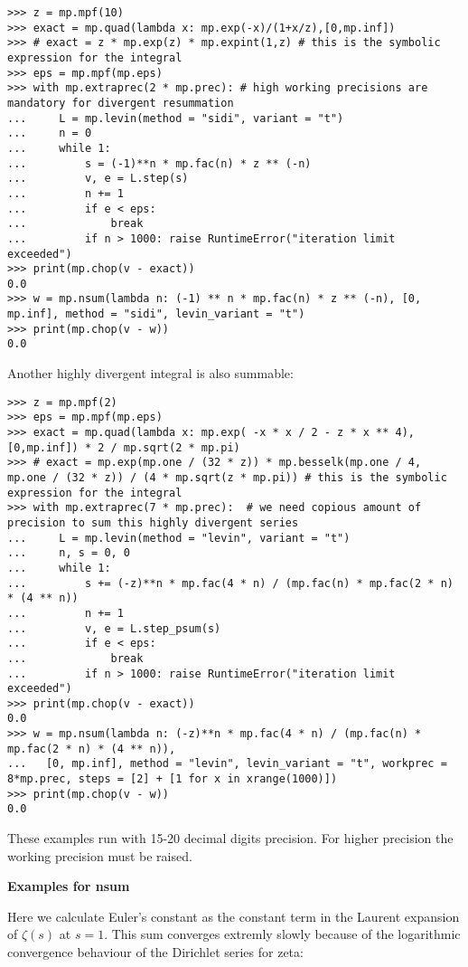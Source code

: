 \begin{lstlisting}
>>> z = mp.mpf(10)
>>> exact = mp.quad(lambda x: mp.exp(-x)/(1+x/z),[0,mp.inf])
>>> # exact = z * mp.exp(z) * mp.expint(1,z) # this is the symbolic expression for the integral
>>> eps = mp.mpf(mp.eps)
>>> with mp.extraprec(2 * mp.prec): # high working precisions are mandatory for divergent resummation
...     L = mp.levin(method = "sidi", variant = "t")
...     n = 0
...     while 1:
...         s = (-1)**n * mp.fac(n) * z ** (-n)
...         v, e = L.step(s)
...         n += 1
...         if e < eps:
...             break
...         if n > 1000: raise RuntimeError("iteration limit exceeded")
>>> print(mp.chop(v - exact))
0.0
>>> w = mp.nsum(lambda n: (-1) ** n * mp.fac(n) * z ** (-n), [0, mp.inf], method = "sidi", levin_variant = "t")
>>> print(mp.chop(v - w))
0.0
\end{lstlisting}

Another highly divergent integral is also summable:

\begin{lstlisting}
>>> z = mp.mpf(2)
>>> eps = mp.mpf(mp.eps)
>>> exact = mp.quad(lambda x: mp.exp( -x * x / 2 - z * x ** 4), [0,mp.inf]) * 2 / mp.sqrt(2 * mp.pi)
>>> # exact = mp.exp(mp.one / (32 * z)) * mp.besselk(mp.one / 4, mp.one / (32 * z)) / (4 * mp.sqrt(z * mp.pi)) # this is the symbolic expression for the integral
>>> with mp.extraprec(7 * mp.prec):  # we need copious amount of precision to sum this highly divergent series
...     L = mp.levin(method = "levin", variant = "t")
...     n, s = 0, 0
...     while 1:
...         s += (-z)**n * mp.fac(4 * n) / (mp.fac(n) * mp.fac(2 * n) * (4 ** n))
...         n += 1
...         v, e = L.step_psum(s)
...         if e < eps:
...             break
...         if n > 1000: raise RuntimeError("iteration limit exceeded")
>>> print(mp.chop(v - exact))
0.0
>>> w = mp.nsum(lambda n: (-z)**n * mp.fac(4 * n) / (mp.fac(n) * mp.fac(2 * n) * (4 ** n)),
...   [0, mp.inf], method = "levin", levin_variant = "t", workprec = 8*mp.prec, steps = [2] + [1 for x in xrange(1000)])
>>> print(mp.chop(v - w))
0.0
\end{lstlisting}

These examples run with 15-20 decimal digits precision. For higher precision the working precision must be raised.

\vpara
\textbf{Examples for nsum}

Here we calculate Euler's constant as the constant term in the Laurent expansion of $\zeta(s)$ at $s=1$. This sum converges extremly slowly because of the logarithmic convergence behaviour of the Dirichlet series for zeta:

